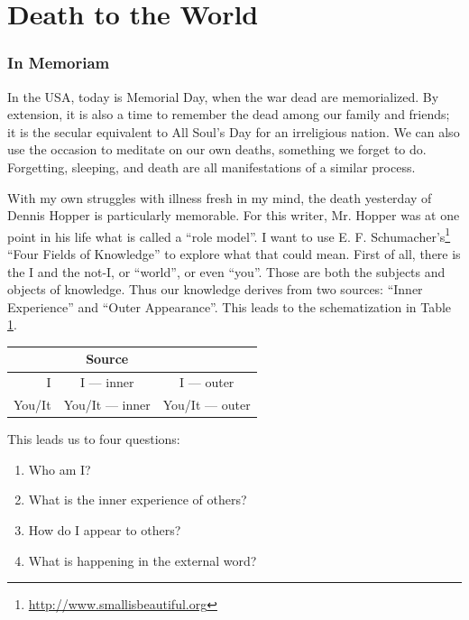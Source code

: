 \section{Death to the World}

\subsubsection{In Memoriam}

In the USA, today is Memorial Day, when the war dead are memorialized. By extension, it is also a time to remember the dead among our family and friends; it is the secular equivalent to All Soul's Day for an irreligious nation. We can also use the occasion to meditate on our own deaths, something we forget to do. Forgetting, sleeping, and death are all manifestations of a similar process.

With my own struggles with illness fresh in my mind, the death yesterday of Dennis Hopper is particularly memorable. For this writer, Mr. Hopper was at one point in his life what is called a ``role model''. I want to use E. F. Schumacher's\footnote{\url{http://www.smallisbeautiful.org}} ``Four Fields of Knowledge'' to explore what that could mean. First of all, there is the I and the not-I, or ``world'', or even ``you''. Those are both the subjects and objects of knowledge. Thus our knowledge derives from two sources: ``Inner Experience'' and ``Outer Appearance''. This leads to the schematization in Table \ref{tab:SchumacherFields}.

\begin{table}[h]\centering\small
\begin{tabular}{rcc}\toprule
& \textbf{Source} & \\\midrule
I & I --- inner & I --- outer \\
You/It & You/It --- inner & You/It --- outer \\\bottomrule
\end{tabular}
\label{tab:SchumacherFields}
\end{table}

This leads us to four questions:

\begin{enumerate}


\item Who am I?

\item What is the inner experience of others?

\item How do I appear to others?

\item What is happening in the external word?
\end{enumerate}


